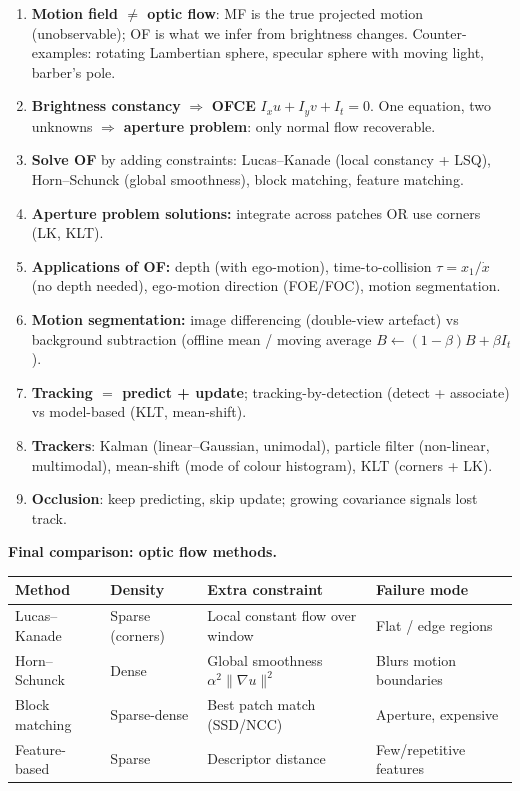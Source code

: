 \begin{keybox}
\begin{enumerate}
  \item \textbf{Motion field $\neq$ optic flow}: MF is the true projected motion (unobservable); OF is what we infer from brightness changes. Counter-examples: rotating Lambertian sphere, specular sphere with moving light, barber's pole.
  \item \textbf{Brightness constancy} $\Rightarrow$ \textbf{OFCE} $I_x u + I_y v + I_t = 0$. One equation, two unknowns $\Rightarrow$ \textbf{aperture problem}: only normal flow recoverable.
  \item \textbf{Solve OF} by adding constraints: Lucas--Kanade (local constancy + LSQ), Horn--Schunck (global smoothness), block matching, feature matching.
  \item \textbf{Aperture problem solutions:} integrate across patches OR use corners (LK, KLT).
  \item \textbf{Applications of OF:} depth (with ego-motion), time-to-collision $\tau = x_1/\dot{x}$ (no depth needed), ego-motion direction (FOE/FOC), motion segmentation.
  \item \textbf{Motion segmentation:} image differencing (double-view artefact) vs background subtraction (offline mean / moving average $B \leftarrow (1-\beta)B + \beta I_t$).
  \item \textbf{Tracking $=$ predict + update}; tracking-by-detection (detect + associate) vs model-based (KLT, mean-shift).
  \item \textbf{Trackers}: Kalman (linear--Gaussian, unimodal), particle filter (non-linear, multimodal), mean-shift (mode of colour histogram), KLT (corners + LK).
  \item \textbf{Occlusion}: keep predicting, skip update; growing covariance signals lost track.
\end{enumerate}
\end{keybox}

\textbf{Final comparison: optic flow methods.}

\begin{center}
\renewcommand{\arraystretch}{1.3}
\begin{tabular}{@{} l l l p{4.5cm} @{}}
\toprule
\textbf{Method} & \textbf{Density} & \textbf{Extra constraint} & \textbf{Failure mode} \\
\midrule
Lucas--Kanade & Sparse (corners) & Local constant flow over window & Flat / edge regions \\
Horn--Schunck & Dense & Global smoothness $\alpha^2 \|\nabla u\|^2$ & Blurs motion boundaries \\
Block matching & Sparse-dense & Best patch match (SSD/NCC) & Aperture, expensive \\
Feature-based & Sparse & Descriptor distance & Few/repetitive features \\
\bottomrule
\end{tabular}
\end{center}

